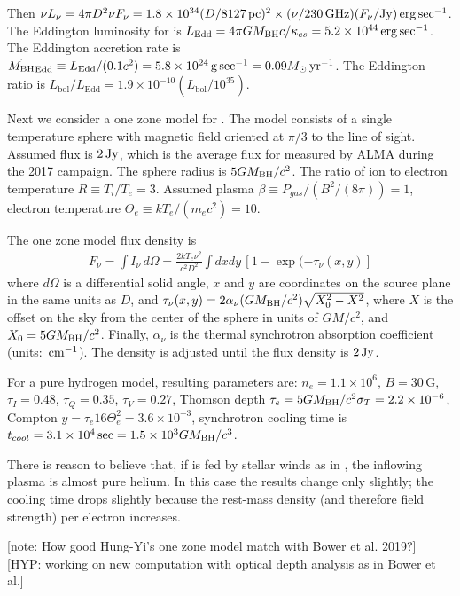\documentclass[twocolumn,tighten,dvipsnames,linenumbers]{aastex63}
\newcommand\note[1]{{\color{OliveGreen}[note: #1]}}
\newcommand\hyp[1]{{\color{Salmon}[HYP: #1]}}
\begin{document}
Then
$ \nu L_\nu
= 4 \pi D^2 \nu F_\nu
= 1.8 \times 10^{34} (D/8127 {\rm \, pc})^2 \times\allowbreak
  (\nu/230 {\rm \, GHz})(F_\nu/{\rm Jy}) {\rm \, erg} \sec^{-1}$.
The Eddington luminosity for \sgra is
$ L_\mathrm{Edd}
= 4\pi GM_{\rm BH} c/\kappa_{es}
= 5.2 \times 10^{44}\allowbreak{\rm \, erg}\sec^{-1}$.
The Eddington accretion rate is
$ \dot{M_{\rm BH}}_\mathrm{Edd}
\equiv L_\mathrm{Edd}/(0.1 c^2)
= 5.8 \times 10^{24} {\rm \, g} \sec^{-1}
= 0.09 M_\odot {\rm \, yr}^{-1}$.
The Eddington ratio is
$ L_\mathrm{bol}/L_\mathrm{Edd}
= 1.9 \times 10^{-10} (L_\mathrm{bol}/10^{35})$.

Next we consider a one zone model for \sgra.
The model consists of a single temperature sphere with magnetic field
oriented at $\pi/3$ to the line of sight.
Assumed flux is $2{\rm \, Jy}$, which is the average flux for \sgra measured
by ALMA during the 2017 campaign.
The sphere radius is
$5 GM_{\rm BH}/c^2$.
The ratio of ion to electron temperature
$R \equiv T_i/T_e = 3$.
Assumed plasma
$\beta \equiv P_{gas}/(B^2/(8\pi)) = 1$,
electron temperature
$\Theta_e \equiv k T_e/(m_e c^2) = 10$.

The one zone model flux density is
\begin{align}
  F_\nu = \int I_\nu \, d\Omega =
  \frac{2 k T_e \nu^2}{c^2 D^2} \int dx dy\,\left[1-\exp(-\tau_\nu(x,y)\right]
\end{align}
where $d\Omega$ is a differential solid angle, $x$ and $y$ are
coordinates on the source plane in the same units as $D$, and
$\tau_\nu(x,y) = 2 \alpha_\nu (GM_{\rm BH}/c^2) \sqrt{X_0^2 - X^2}$,
where $X$ is the offset on the sky from the center of the sphere in
units of
$GM/c^2$, and $X_0 = 5 GM_{\rm BH}/c^2$.
Finally, $\alpha_\nu$ is the thermal synchrotron absorption
coefficient (units: ${\rm \, cm}^{-1}$).
The density is adjusted until the flux density is $2{\rm \, Jy}$.

For a pure hydrogen model, resulting parameters are: $n_e = 1.1 \times
10^6$, $B = 30\,\mathrm{G}$, $\tau_I = 0.48$, $\tau_Q = 0.35 $,
$\tau_V = 0.27$, Thomson depth $\tau_e = 5 GM_{\rm BH}/c^2 \sigma_T = 2.2
\times 10^{-6}$, Compton $y = \tau_e 16 \Theta_e^2 = 3.6 \times
10^{-3}$, synchrotron cooling time is $t_{cool} = 3.1 \times 10^4\sec
= 1.5 \times 10^3 GM_{\rm BH}/c^3$.

There is reason to believe that, if \sgra is fed by stellar winds as
in \citet{2019MNRAS.482L.123R}, the inflowing plasma is almost pure
helium.
In this case the results change only slightly; the cooling time drops
slightly because the rest-mass density (and therefore field strength)
per electron increases.

\note{How good Hung-Yi's one zone model match with Bower et al. 2019?}
\hyp{working on new computation with optical depth analysis as in Bower et al.}
\end{document}
